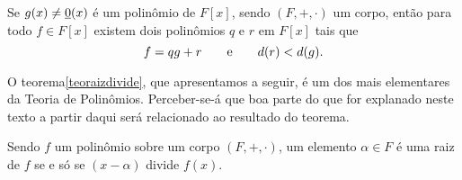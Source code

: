 \begin{Obs}\label{obsalgdiv}
  \mbox{}
  Se $g(x)\neq\underline{0}(x)$ é um polinômio de $F[x]$, sendo $(F,+,\cdot)$ um
  corpo, então para todo $f\in F[x]$ existem dois polinômios $q$ e $r$
  em $F[x]$ tais que
  \begin{equation*}
    f = qg + r\qquad\text{e}\qquad d(r)<d(g)\mathrm{.}
  \end{equation*}
\end{Obs}

O teorema\xspace\ref{teoraizdivide}, que apresentamos a seguir, é um dos
mais elementares da Teoria de Polinômios. Perceber-se-á que boa parte do
que for explanado neste texto a partir daqui será relacionado ao
resultado do teorema.

\begin{Teo}\label{teoraizdivide}
  Sendo
  $f$ um polinômio sobre um corpo $(F,+,\cdot)$,
  um elemento $\alpha\in F$ é uma raiz de
  $f$ se e só se $(x-\alpha)$ divide $f(x)$.
\end{Teo}

